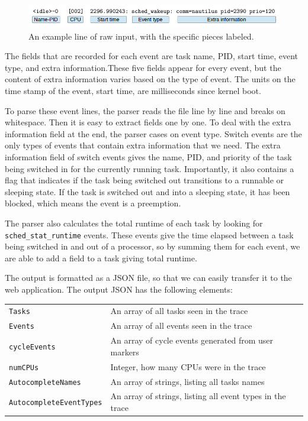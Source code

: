 \documentclass{hmcclinic}
\begin{document}
  \begin{figure}
  \includegraphics[scale=0.4]{parserExample.png}
  \caption{An example line of raw input, with the specific pieces labeled.}
  \end{figure}

  The fields that are recorded for each event are task name, PID, start time, 
  event type, and extra information.These five fields appear for every event, but the content of extra information
  varies based on the type of event. The units on the time stamp of the event,
  start time, are milliseconds since kernel boot.

  To parse these event lines, the parser reads the file line by line and breaks on
  whitespace. Then it is easy to extract fields one by one. To deal with the
  extra information field at the end, the parser cases on event type. Switch events
  are the only types of events that contain extra information that we need.  The
  extra information field of switch events gives the name, PID, and priority of
  the task being switched in for the currently running task. Importantly, it
  also contains a flag that indicates if the task being switched out transitions
  to a runnable or sleeping state. If the task is switched out and into a
  sleeping state, it has been blocked, which means the event is a preemption.

  The parser also calculates the total runtime of each task by looking for
\texttt{sched\_stat\_runtime} events. These events give the time elapsed between
  a task being switched in and out of a processor, so by summing them for 
  each event, we are able to add a field to a task giving total runtime.

  The output is formatted as a JSON file, so that we can easily transfer it to
  the web application. The output JSON has the following elements:

  \begin{center}
    \begin{tabular}{ll}
      \toprule
      \texttt{Tasks}      & An array of all tasks seen in the trace\\
       \texttt{Events}     & An array of all events seen in the trace\\
       \texttt{cycleEvents} & An array of cycle events generated from user markers\\
       \texttt{numCPUs}     & Integer, how many CPUs were in the trace\\
       \texttt{AutocompleteNames} & An array of strings, listing all tasks names\\
       \texttt{AutocompleteEventTypes} & An array of strings, listing all event types in the trace\\
      \bottomrule
    \end{tabular}
  \end{center}
\end{document}
